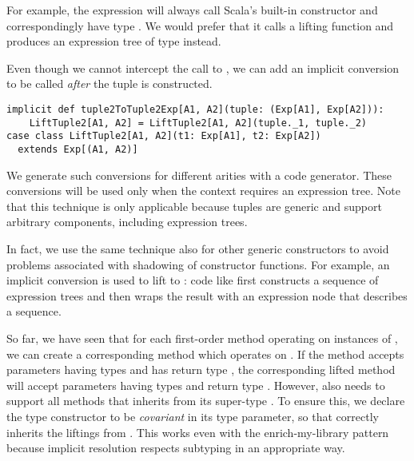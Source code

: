 For example, the expression  will always call Scala's built-in  constructor and correspondingly have type . We would prefer that it calls a lifting function and produces an expression tree of type  instead.

Even though we cannot intercept the call to , we can add an implicit conversion to be called \emph{after} the tuple is constructed.

\begin{lstlisting}
implicit def tuple2ToTuple2Exp[A1, A2](tuple: (Exp[A1], Exp[A2])):
    LiftTuple2[A1, A2] = LiftTuple2[A1, A2](tuple._1, tuple._2)
case class LiftTuple2[A1, A2](t1: Exp[A1], t2: Exp[A2])
  extends Exp[(A1, A2)]
\end{lstlisting}

We generate such conversions for different arities with a code generator. These conversions will be used only when the context requires an expression tree. Note that this technique is only applicable because tuples are generic and support arbitrary components, including expression trees.

In fact, we use the same technique also for other generic constructors to avoid problems associated with shadowing of constructor functions. For example, an implicit conversion is used to lift  to : code like  first constructs a sequence of expression trees and then wraps the result with an expression node that describes a sequence.

So far, we have seen that for each first-order method  operating on instances of , we can create a corresponding method which operates on . If the method accepts parameters having types  and has return type , the corresponding lifted method will accept parameters having types  and return type . However,  also needs to support all methods that  inherits from its super-type . To ensure this, we declare the type constructor  to be \emph{covariant} in its type parameter, so that  correctly inherits the liftings from . This works even with the enrich-my-library pattern because implicit resolution respects subtyping in an appropriate way.

